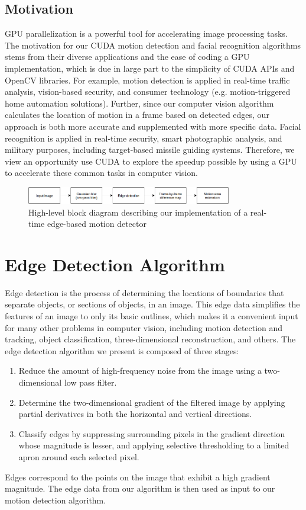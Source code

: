\documentclass[journal]{IEEEtran}
\begin{document}
\subsection{Motivation}
GPU parallelization is a powerful tool for accelerating image processing tasks. The motivation for our CUDA motion detection and facial recognition algorithms stems from their diverse applications and the ease of coding a GPU implementation, which is due in large part to the simplicity of CUDA APIs and OpenCV libraries. For example, motion detection is applied in real-time traffic analysis, vision-based security, and consumer technology (e.g. motion-triggered home automation solutions). Further, since our computer vision algorithm calculates the location of motion in a frame based on detected edges, our approach is both more accurate and supplemented with more specific data. Facial recognition is applied in real-time security, smart photographic analysis, and military purposes, including target-based missile guiding systems. Therefore, we view an opportunity use CUDA to explore the speedup possible by using a GPU to accelerate these common tasks in computer vision.

\begin{figure}
	\centering
	\includegraphics[width=0.8\textwidth]{high_level_block_diagram.png}
	\caption{High-level block diagram describing our implementation of a real-time edge-based motion detector}
	\label{motion-detection-block-diagram}
\end{figure}


\section{Edge Detection Algorithm}
\label{edge-detection-section}
Edge detection is the process of determining the locations of boundaries that separate objects, or sections of objects, in an image. This edge data simplifies the features of an image to only its basic outlines, which makes it a convenient input for many other problems in computer vision, including motion detection and tracking, object classification, three-dimensional reconstruction, and others. The edge detection algorithm we present is composed of three stages:
\begin{enumerate}
	\item Reduce the amount of high-frequency noise from the image using a two-dimensional low pass filter.
	\item Determine the two-dimensional gradient of the filtered image by applying partial derivatives in both the horizontal and vertical directions.
	\item Classify edges by suppressing surrounding pixels in the gradient direction whose magnitude is lesser, and applying selective thresholding to a limited apron around each selected pixel.
\end{enumerate}
Edges correspond to the points on the image that exhibit a high gradient magnitude. The edge data from our algorithm is then used as input to our motion detection algorithm.
\end{document}
